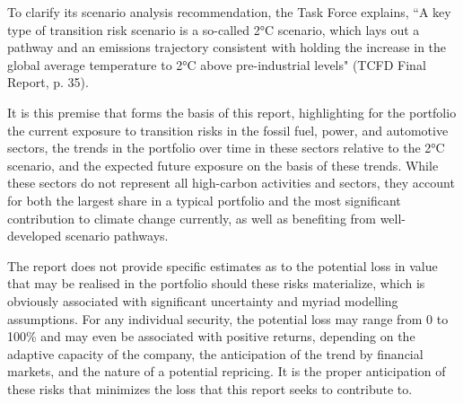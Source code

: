 \documentclass[10pt,table,a4]{article}\usepackage[]{graphicx}\usepackage[]{color}
\begin{document}
\begin{multicols}{2}
		To clarify its scenario analysis recommendation, the Task Force explains, ``A key type of transition risk scenario is a so-called 2°C scenario, which lays out a pathway and an emissions trajectory consistent with holding the increase in the global average temperature to 2°C above pre-industrial levels" (TCFD Final Report, p. 35).
		
		It is this premise that forms the basis of this report, highlighting for the portfolio the current exposure to transition risks in the fossil fuel, power, and automotive sectors, the trends in the portfolio over time in these sectors relative to the 2°C scenario, and the expected future exposure on the basis of these trends. While these sectors do not represent all high-carbon activities and sectors, they account for both the largest share in a typical portfolio and the most significant contribution to climate change currently, as well as benefiting from well-developed scenario pathways.
		
		The report does not provide specific estimates as to the potential loss in value that may be realised in the portfolio should these risks materialize, which is obviously associated with significant uncertainty and myriad modelling assumptions. For any individual security, the potential loss may range from 0 to 100\% and may even be associated with positive returns, depending on the adaptive capacity of the company, the anticipation of the trend by financial markets, and the nature of a potential repricing. It is the proper anticipation of these risks that minimizes the loss that this report seeks to contribute to. 
		
		
		
	\end{multicols}
	
\end{document}
